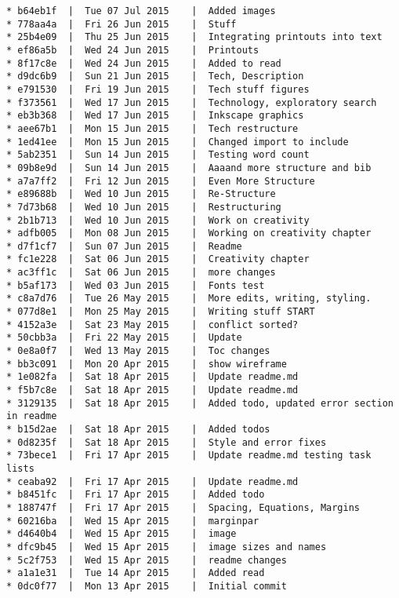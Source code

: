\begin{verbatim}
* b64eb1f  |  Tue 07 Jul 2015	 |  Added images
* 778aa4a  |  Fri 26 Jun 2015	 |  Stuff
* 25b4e09  |  Thu 25 Jun 2015	 |  Integrating printouts into text
* ef86a5b  |  Wed 24 Jun 2015	 |  Printouts
* 8f17c8e  |  Wed 24 Jun 2015	 |  Added to read
* d9dc6b9  |  Sun 21 Jun 2015	 |  Tech, Description
* e791530  |  Fri 19 Jun 2015	 |  Tech stuff figures
* f373561  |  Wed 17 Jun 2015	 |  Technology, exploratory search
* eb3b368  |  Wed 17 Jun 2015	 |  Inkscape graphics
* aee67b1  |  Mon 15 Jun 2015	 |  Tech restructure
* 1ed41ee  |  Mon 15 Jun 2015	 |  Changed import to include
* 5ab2351  |  Sun 14 Jun 2015	 |  Testing word count
* 09b8e9d  |  Sun 14 Jun 2015	 |  Aaaand more structure and bib
* a7a7ff2  |  Fri 12 Jun 2015	 |  Even More Structure
* e89688b  |  Wed 10 Jun 2015	 |  Re-Structure
* 7d73b68  |  Wed 10 Jun 2015	 |  Restructuring
* 2b1b713  |  Wed 10 Jun 2015	 |  Work on creativity
* adfb005  |  Mon 08 Jun 2015	 |  Working on creativity chapter
* d7f1cf7  |  Sun 07 Jun 2015	 |  Readme
* fc1e228  |  Sat 06 Jun 2015	 |  Creativity chapter
* ac3ff1c  |  Sat 06 Jun 2015	 |  more changes
* b5af173  |  Wed 03 Jun 2015	 |  Fonts test
* c8a7d76  |  Tue 26 May 2015	 |  More edits, writing, styling.
* 077d8e1  |  Mon 25 May 2015	 |  Writing stuff START
* 4152a3e  |  Sat 23 May 2015	 |  conflict sorted?
* 50cbb3a  |  Fri 22 May 2015	 |  Update
* 0e8a0f7  |  Wed 13 May 2015	 |  Toc changes
* bb3c091  |  Mon 20 Apr 2015	 |  show wireframe
* 1e082fa  |  Sat 18 Apr 2015	 |  Update readme.md
* f5b7c8e  |  Sat 18 Apr 2015	 |  Update readme.md
* 3129135  |  Sat 18 Apr 2015	 |  Added todo, updated error section in readme
* b15d2ae  |  Sat 18 Apr 2015	 |  Added todos
* 0d8235f  |  Sat 18 Apr 2015	 |  Style and error fixes
* 73bece1  |  Fri 17 Apr 2015	 |  Update readme.md testing task lists
* ceaba92  |  Fri 17 Apr 2015	 |  Update readme.md
* b8451fc  |  Fri 17 Apr 2015	 |  Added todo
* 188747f  |  Fri 17 Apr 2015	 |  Spacing, Equations, Margins
* 60216ba  |  Wed 15 Apr 2015	 |  marginpar
* d4640b4  |  Wed 15 Apr 2015	 |  image
* dfc9b45  |  Wed 15 Apr 2015	 |  image sizes and names
* 5c2f753  |  Wed 15 Apr 2015	 |  readme changes
* a1a1e31  |  Tue 14 Apr 2015	 |  Added read
* 0dc0f77  |  Mon 13 Apr 2015	 |  Initial commit
\end{verbatim}